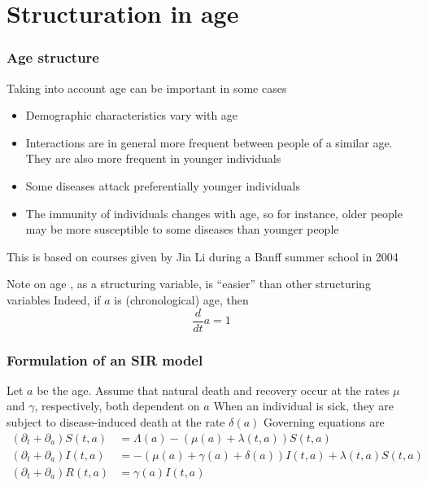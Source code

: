 \documentclass[aspectratio=169]{beamer}\usepackage[]{graphicx}\usepackage[]{xcolor}
\begin{document}
\section{Structuration in age}
\begin{frame}\frametitle{Age structure}
Taking into account age can be important in some cases
\vfill
\begin{itemize}
\item Demographic characteristics vary with age
\item Interactions are in general more frequent between people of a similar age. They are also more frequent in younger individuals
\item Some diseases attack preferentially younger individuals
\item The immunity of individuals changes with age, so for instance, older people may be more susceptible to some diseases than younger people
\end{itemize}
\vfill
This is based on courses given by Jia Li during a Banff summer school in 2004
\end{frame}


\begin{frame}{Note on age}
, as a structuring variable, is ``easier'' than other structuring variables
\vfill
Indeed, if $a$ is (chronological) age, then
\[
\frac{d}{dt}a = 1
\]
\end{frame}


\begin{frame}\frametitle{Formulation of an SIR model}
Let $a$ be the age. Assume that natural death and recovery occur at the rates $\mu$ and $\gamma$, respectively, both dependent on $a$
\vfill
When an individual is sick, they are subject to disease-induced death at the rate $\delta(a)$
\vfill
Governing equations are
\footnotesize
\begin{subequations}\label{sys:SIR_age_structure}
\begin{align}
(\partial_t+\partial_a)S(t,a) &=
\Lambda(a)-(\mu(a)+\lambda(t,a))S(t,a)
\label{sys:SIR_age_structure_S} \\
(\partial_t+\partial_a)I(t,a) &=
-(\mu(a)+\gamma(a)+\delta(a))I(t,a)+\lambda(t,a)S(t,a)
\label{sys:SIR_age_structure_I} \\
(\partial_t+\partial_a)R(t,a) &=
\gamma(a)I(t,a)
\label{sys:SIR_age_structure_R}
\end{align}
\end{subequations}
\end{frame}
\end{document}
